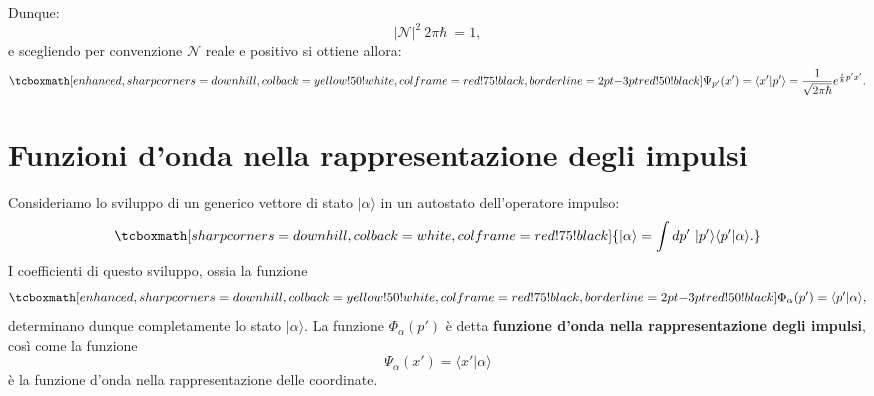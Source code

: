 Dunque:
	\begin{equation}
		\vert\mathcal{N} \vert ^2\ 2 \pi \hbar\ =1,
	\end{equation}
e scegliendo per convenzione $\mathcal{N}$ reale e positivo si ottiene allora:
	\begin{equation}
		\tcboxmath[enhanced,sharp corners=downhill ,colback=yellow!50!white,colframe=red!75!black, borderline={2pt}{-3pt}{red!50!black}]{
			\Psi_{p'}(x') = \langle x' | p' \rangle = \frac{1}{\sqrt{2 \pi \hbar}} e^{\frac{i}{\hbar}p'x'}.
			}
	\end{equation}

\section[Funzioni d'onda nella rappresentazione degli impulsi]{Funzioni d'onda nella rappresentazione degli impulsi}
Consideriamo lo sviluppo di un generico vettore di stato $| \alpha \rangle$ in un autostato dell'operatore impulso:
	\begin{equation}
		\tcboxmath[sharp corners=downhill ,colback=white,colframe=red!75!black]{
			| \alpha \rangle = \int dp' ~ | p' \rangle \langle p' | \alpha \rangle.
		}	
	\end{equation}
I coefficienti di questo sviluppo, ossia la funzione
	\begin{equation}
		\tcboxmath[enhanced,sharp corners=downhill ,colback=yellow!50!white,colframe=red!75!black, borderline={2pt}{-3pt}{red!50!black}]{
			\Phi_\alpha (p') =  \langle p' | \alpha \rangle,
			}
	\end{equation}
determinano dunque completamente lo stato $| \alpha \rangle$. La funzione $\Phi_\alpha (p')$ è detta \textbf{funzione d'onda nella rappresentazione degli impulsi}, così come la funzione
	\begin{equation}
		\Psi_\alpha (x') =  \langle x' | \alpha \rangle
	\end{equation}
è la funzione d'onda nella rappresentazione delle coordinate.\\

